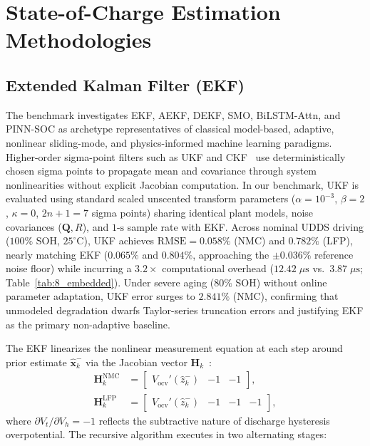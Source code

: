 \documentclass[balance,nocopyright,upint,varvw,hyphenate,barcolor=NavyBlue,nolists]{asmejour}
\begin{document}
\section{State-of-Charge Estimation Methodologies}

\subsection{Extended Kalman Filter (EKF)}
The benchmark investigates EKF, AEKF, DEKF, SMO, BiLSTM-Attn, and PINN-SOC as archetype representatives of classical model-based, adaptive, nonlinear sliding-mode, and physics-informed machine learning paradigms. Higher-order sigma-point filters such as UKF and CKF~\cite{Plett2006ukf,He2013ukf} use deterministically chosen sigma points to propagate mean and covariance through system nonlinearities without explicit Jacobian computation. In our benchmark, UKF is evaluated using standard scaled unscented transform parameters ($\alpha = 10^{-3}$, $\beta = 2$, $\kappa = 0$, $2n+1=7$ sigma points) sharing identical plant models, noise covariances ($\mathbf{Q}, R$), and $1\text{-s}$ sample rate with EKF. Across nominal UDDS driving ($100\%$ SOH, $25^\circ\text{C}$), UKF achieves $\text{RMSE} = 0.058\%$ (NMC) and $0.782\%$ (LFP), nearly matching EKF ($0.065\%$ and $0.804\%$, approaching the $\pm 0.036\%$ reference noise floor) while incurring a $3.2\times$ computational overhead ($12.42\;\mu\text{s}$ vs.\ $3.87\;\mu\text{s}$; Table~\ref{tab:8_embedded}). Under severe aging ($80\%$ SOH) without online parameter adaptation, UKF error surges to $2.841\%$ (NMC), confirming that unmodeled degradation dwarfs Taylor-series truncation errors and justifying EKF as the primary non-adaptive baseline.

The EKF linearizes the nonlinear measurement equation at each step around prior estimate $\hat{\mathbf{x}}_k^-$ via the Jacobian vector $\mathbf{H}_k$~\cite{Plett2004part3}:
\begin{align}\label{eqn:ekf_jacobian}
\mathbf{H}_k^{\text{NMC}} &= \begin{bmatrix} V_{\text{ocv}}'(\hat{z}_k^-) & -1 & -1 \end{bmatrix}, \nonumber\\
\mathbf{H}_k^{\text{LFP}} &= \begin{bmatrix} V_{\text{ocv}}'(\hat{z}_k^-) & -1 & -1 & -1 \end{bmatrix},
\end{align}
where $\partial V_t / \partial V_h = -1$ reflects the subtractive nature of discharge hysteresis overpotential. The recursive algorithm executes in two alternating stages:
\end{document}
